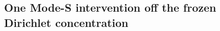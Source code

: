 \documentclass{article}
\begin{document}
\subsection{One Mode-S intervention off the frozen Dirichlet concentration}
\label{app:heterogeneity_modeS}
\end{document}
